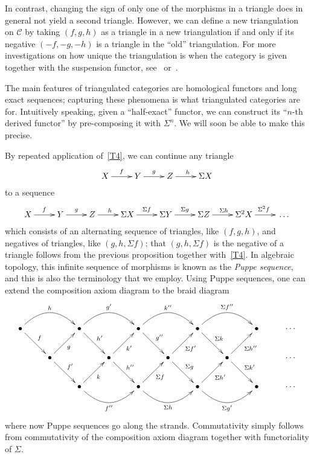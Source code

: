 \documentclass{amsproc}
\theoremstyle{definition}
\begin{document}
In contrast, changing the sign of only one of the morphisms in a triangle does in general not yield a second triangle. However, we can define a new triangulation on ${\mathcal{C}}$ by taking $(f,g,h)$ as a triangle in a new triangulation if and only if its negative $(-f,-g,-h)$ is a triangle in the ``old'' triangulation. For more investigations on how unique the triangulation is when the category is given together with the suspension functor, see~\cite[Sec.~2.4]{May} or~\cite{Bal}.

The main features of triangulated categories are homological functors and long exact sequences; capturing these phenomena is what triangulated categories are for. Intuitively speaking, given a ``half-exact'' functor, we can construct its ``$n$-th derived functor'' by pre-composing it with $\Sigma^n$. We will soon be able to make this precise. 

By repeated application of~\ref{T4}, we can continue any triangle
\begin{displaymath}
\xymatrix{X\ar[r]^f & Y\ar[r]^g & Z\ar[r]^h & {}\Sigma X}
\end{displaymath}
to a sequence
\begin{displaymath}
\xymatrix{X\ar[r]^f & Y\ar[r]^g & Z\ar[r]^h & {}\Sigma X\ar[r]^{\Sigma f} & {}\Sigma Y\ar[r]^{\Sigma g} & {}\Sigma Z\ar[r]^{\Sigma h} & {}\Sigma^2 X\ar[r]^{\Sigma^2 f} & {}\ldots}
\end{displaymath}
which consists of an alternating sequence of triangles, like $(f,g,h)$, and negatives of triangles, like $(g,h,\Sigma f)$; that $(g,h,\Sigma f)$ is the negative of a triangle follows from the previous proposition together with~\ref{T4}. In algebraic topology, this infinite sequence of morphisms is known as the \emph{Puppe sequence}, and this is also the terminology that we employ. Using Puppe sequences, one can extend the composition axiom diagram to the braid diagram
\begin{displaymath}
\xymatrix{{\bullet}\ar@(ru,lu)[rr]^h\ar[rd]^f & & {\bullet}\ar@(ru,lu)[rr]^{g'}\ar[rd]^{h'} & & {\bullet}\ar@(ru,lu)[rr]^{k''}\ar[rd]^{g''} & & {\bullet}\ar@(ru,lu)[rr]^{\Sigma f''}\ar[rd]^{\Sigma k} & & {\bullet} & {}\cdots\\
& {\bullet}\ar[ur]_g\ar[rd]^{f'} & & {\bullet}\ar[ru]_{k'}\ar[rd]^{h''} & & {\bullet}\ar[ru]_{\Sigma f'}\ar[rd]^{\Sigma g} & & {\bullet}\ar[rd]^{\Sigma k'}\ar[ru]_{\Sigma h''} & &  {}\cdots\\
& & {\bullet}\ar@(rd,ld)[rr]_{f''}\ar[ru]_{k} & & {\bullet}\ar[ru]_{\Sigma f}\ar@(rd,ld)[rr]_{\Sigma h} & & {\bullet}\ar@(rd,ld)[rr]_{\Sigma g'}\ar[ru]_{\Sigma h'} & & {\bullet} & {}\cdots}
\end{displaymath}
where now Puppe sequences go along the strands. Commutativity simply follows from commutativity of the composition axiom diagram together with functoriality of $\Sigma$. 
\end{document}
